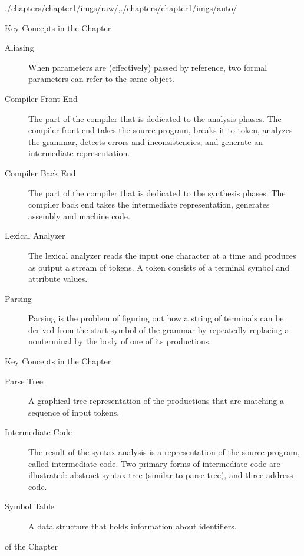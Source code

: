 \begin{graphicspathcontext}{{./chapters/chapter1/imgs/raw/},{./chapters/chapter1/imgs/auto/}}
\begin{bibunit}[apalike]
\begin{frame}[t]{{Key Concepts} in the Chapter \insertcontinuationtext}
	\begin{description}
		\item[Aliasing] When parameters are (effectively) passed by reference, two formal parameters can refer to the same object.
		\item[Compiler Front End] The part of the compiler that is dedicated to the analysis phases. The compiler front end takes the source program, breaks it to token, analyzes the grammar, detects errors and inconsistencies, and generate an intermediate representation.
		\item[Compiler Back End] The part of the compiler that is dedicated to the synthesis phases. The compiler back end takes the intermediate representation, generates assembly and machine code.
		\item[Lexical Analyzer] The lexical analyzer reads the input one character at a time and produces as output a stream of tokens. A token consists of a terminal symbol and attribute values.
		\item[Parsing] Parsing is the problem of figuring out how a string of terminals can be derived from the start symbol of the grammar by repeatedly replacing a nonterminal by the body of one of its productions.
	\end{description}
\end{frame}


\begin{frame}[t]{{Key Concepts} in the Chapter \insertcontinuationtext}
	\begin{description}
		\item[Parse Tree] A graphical tree representation of the productions that are matching a sequence of input tokens.
		\item[Intermediate Code] The result of the syntax analysis is a representation of the source program, called intermediate code. Two primary forms of intermediate code are illustrated: abstract syntax tree (similar to parse tree), and three-address code.
		\item[Symbol Table] A data structure that holds information about identifiers.
	\end{description}
\end{frame}

\begin{frame}[t,fancyframetitle=false]{{\bibname} of the Chapter}%
	\tiny%
\end{frame}%

\end{bibunit}
\end{graphicspathcontext}
